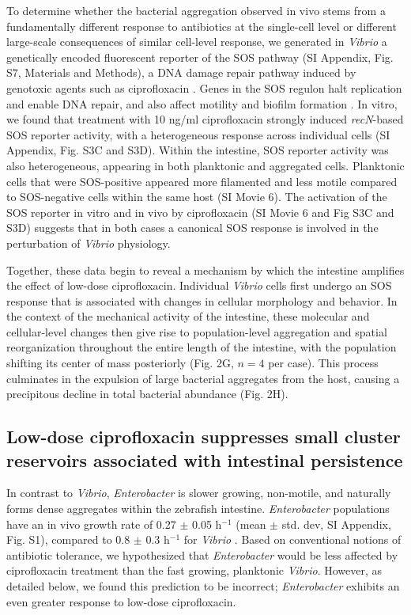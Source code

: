 To determine whether the bacterial aggregation observed in vivo stems from a fundamentally different response to antibiotics at the single-cell level or different large-scale consequences of similar cell-level response, we generated in \textit{Vibrio} a genetically encoded fluorescent reporter of the SOS pathway (SI Appendix, Fig. S7, Materials and Methods), a DNA damage repair pathway induced by genotoxic agents such as ciprofloxacin \cite{erill2007aeons,kreuzer2013dna}. Genes in the SOS regulon halt replication and enable DNA repair, and also affect motility and biofilm formation \cite{irazoki2016sos,goneau2015subinhibitory}. In vitro, we found that treatment with 10 ng/ml ciprofloxacin strongly induced \textit{recN}-based SOS reporter activity, with a heterogeneous response across individual cells (SI Appendix, Fig. S3C and S3D). Within the intestine, SOS reporter activity was also heterogeneous, appearing in both planktonic and aggregated cells. Planktonic cells that were SOS-positive appeared more filamented and less motile compared to SOS-negative cells within the same host (SI Movie 6). The activation of the SOS reporter in vitro and in vivo by ciprofloxacin (SI Movie 6 and Fig S3C and S3D) suggests that in both cases a canonical SOS response is involved in the perturbation of \textit{Vibrio} physiology. 

Together, these data begin to reveal a mechanism by which the intestine amplifies the effect of low-dose ciprofloxacin. Individual \textit{Vibrio} cells first undergo an SOS response that is associated with changes in cellular morphology and behavior. In the context of the mechanical activity of the intestine, these molecular and cellular-level changes then give rise to population-level aggregation and spatial reorganization throughout the entire length of the intestine, with the population shifting its center of mass posteriorly (Fig. 2G, $n=4$ per case). This process culminates in the expulsion of large bacterial aggregates from the host, causing a precipitous decline in total bacterial abundance (Fig. 2H).



\subsection{Low-dose ciprofloxacin suppresses small cluster reservoirs associated with intestinal persistence}

In contrast to \textit{Vibrio}, \textit{Enterobacter} is slower growing, non-motile, and naturally forms dense aggregates within the zebrafish intestine. \textit{Enterobacter} populations have an in vivo growth rate of 0.27 $\pm$ 0.05 h$^{-1}$ (mean $\pm$ std. dev, SI Appendix, Fig. S1), compared to 0.8 $\pm$ 0.3 h$^{-1}$ for \textit{Vibrio} \cite{Wiles2016}. Based on conventional notions of antibiotic tolerance, we hypothesized that \textit{Enterobacter} would be less affected by ciprofloxacin treatment than the fast growing, planktonic \textit{Vibrio}. However, as detailed below, we found this prediction to be incorrect; \textit{Enterobacter} exhibits an even greater response  to low-dose ciprofloxacin.

